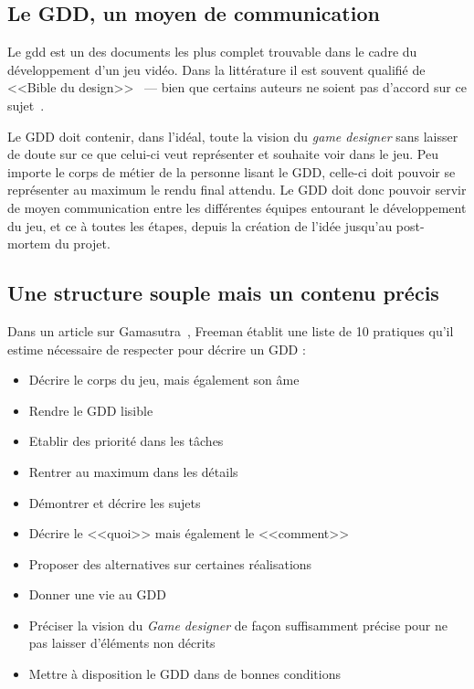 \subsection{Le GDD, un moyen de communication}
Le \gls{gdd} est un des documents les plus complet trouvable dans le cadre du développement d'un jeu vidéo. Dans la littérature il est souvent qualifié de <<Bible du design>>~\cite{GD_foundations_pedersen} --- bien que certains auteurs ne soient pas d'accord sur ce sujet~\cite{LevelUpRogers2014}. 

Le GDD doit contenir, dans l'idéal, toute la vision du \emph{game designer} sans laisser de doute sur ce que celui-ci veut représenter et souhaite voir dans le jeu. Peu importe le corps de métier de la personne lisant le GDD, celle-ci doit pouvoir se représenter au maximum le rendu final attendu. Le GDD doit donc pouvoir servir de moyen communication entre les différentes équipes entourant le développement du jeu, et ce \`a toutes les étapes, depuis la création de l'idée jusqu'au post-mortem du projet.

\subsection{Une structure souple mais un contenu précis}


Dans un article sur Gamasutra~\cite{gama_greateGDD}, Freeman établit une liste de 10 pratiques qu'il estime nécessaire de respecter pour d\'ecrire un GDD :
\begin{itemize}
    \item Décrire le corps du jeu, mais également son âme
    \item Rendre le GDD lisible
    \item Etablir des priorité dans les tâches
    \item Rentrer au maximum dans les détails
    \item Démontrer et décrire les sujets
    \item Décrire le <<quoi>> mais également le <<comment>>
    \item Proposer des alternatives sur certaines réalisations 
    \item Donner une vie au GDD
    \item Pr\'eciser la vision du \emph{Game designer} de fa\c{c}on suffisamment précise pour ne pas laisser d'éléments non décrits
    \item Mettre à disposition le GDD dans de bonnes conditions
\end{itemize}

